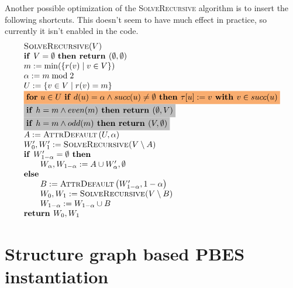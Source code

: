\documentclass{article}
\newcommand{\If}{\text{\textbf{if }}}
\newcommand{\Then}{\text{\textbf{ then }}}
\newcommand{\Else}{\text{\textbf{else }}}
\newcommand{\Return}{\text{\textbf{return }}}
\newcommand{\With}{\text{\textbf{ with }}}
\begin{document}
Another possible optimization of the \textsc{SolveRecursive} algorithm is to insert the
following shortcuts. This doesn't seem to have much effect in practice, so currently it
isn't enabled in the code.
\begin{equation*}
\begin{array}{l}
\textsc{SolveRecursive}(V) \\ 
\If V=\emptyset \text{ \textbf{then return }}(\emptyset
,\emptyset ) \\ 
m:=\min (\{r(v)\mid v\in V\}) \\ 
\alpha :=m \bmod 2 \\ 
U:=\{v\in V\mid r(v)=m\} \\ 
\colorbox{Apricot}{$
\text{\textbf{for} }u\in U\text{ \textbf{if} }d(u)=\alpha \wedge succ(u)\neq
\emptyset \Then \tau \lbrack u]:=v\With v\in
succ(u) $}\\ 
\colorbox{lightgray}{$
\If h=m\wedge even(m) \Then \Return (\emptyset,V) $}\\ 
\colorbox{lightgray}{$
\If h=m\wedge odd(m) \Then \Return (V,\emptyset) $}\\
A:=\text{\textsc{AttrDefault}}\left( U,\alpha \right)  \\ 
W_{0}^{\prime },W_{1}^{\prime }:=\text{\textsc{SolveRecursive(}}V\setminus A%
\text{)} \\ 
\If W_{1-\alpha }^{\prime }= \emptyset \Then \\ 
\qquad W_{\alpha },W_{1-\alpha }:=A\cup W_{\alpha }^{\prime }, \emptyset \\ 
\Else \\ 
\qquad B:=\text{\textsc{AttrDefault}}\left( W_{1-\alpha }^{\prime },1-\alpha \right)  \\ 
\qquad W_{0},W_{1}:=\text{\textsc{SolveRecursive(}}V\setminus B\text{)} \\ 
\qquad W_{1-\alpha }:=W_{1-\alpha }\cup B \\ 
\Return W_{0},W_{1}%
\end{array}%
\end{equation*}%

\newpage
\section{Structure graph based PBES instantiation}
\end{document}
